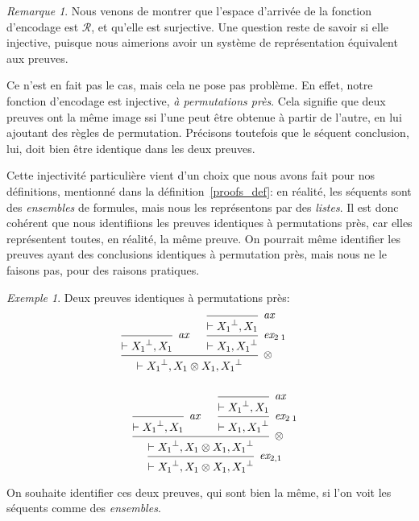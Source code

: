 \documentclass[11pt,a4paper]{article}
\theoremstyle{plain}
\theoremstyle{definition}
\theoremstyle{remark}
\newtheorem{remark}{Remarque}
\newtheorem{example}{Exemple}
\newcommand*{\orth}{^\perp}
\newcommand*{\tensor}{\otimes}
\newcommand*{\axv}[1]{\infer{0}[\ensuremath{\mathit{ax}}]{\vdash #1}}
\newcommand*{\tensorv}[1]{\infer{2}[\ensuremath{\tensor}]{\vdash #1}}
\newcommand*{\permv}[2]{\infer{1}[\ensuremath{\textit{ex}_{#1}}]{\vdash #2}}
\newcommand*{\representations}{\ensuremath{\mathcal{R}}}
\begin{document}
\begin{remark}
    \label{remark_kernel}
    Nous venons de montrer que l'espace d'arrivée de la fonction d'encodage est $\representations$, et qu'elle est surjective. Une question reste de savoir si elle injective, puisque nous aimerions avoir un système de représentation équivalent aux preuves.

    Ce n'est en fait pas le cas, mais cela ne pose pas problème. En effet, notre fonction d'encodage est injective, \textit{à permutations près}. Cela signifie que deux preuves ont la même image ssi l'une peut être obtenue à partir de l'autre, en lui ajoutant des règles de permutation. Précisons toutefois que le séquent conclusion, lui, doit bien être identique dans les deux preuves.

    Cette injectivité particulière vient d'un choix que nous avons fait pour nos définitions, mentionné dans la définition~\ref{proofs_def}: en réalité, les séquents sont des \textit{ensembles} de formules, mais nous les représentons par des \textit{listes}. Il est donc cohérent que nous identifiions les preuves identiques à permutations près, car elles représentent toutes, en réalité, la même preuve. On pourrait même identifier les preuves ayant des conclusions identiques à permutation près, mais nous ne le faisons pas, pour des raisons pratiques.

    \begin{example}Deux preuves identiques à permutations près:
        \begin{align*}
        \begin{multlined}
            \begin{prooftree}
               \axv{{X_1}\orth, X_1}
               \axv{{X_1}\orth, X_1}
               \permv{2 \;1}{X_1, {X_1}\orth}
            \tensorv{{X_1}\orth, X_1 \tensor X_1, {X_1}\orth}
            \end{prooftree} \\ \\
            \begin{prooftree}
               \axv{{X_1}\orth, X_1}
               \axv{{X_1}\orth, X_1}
               \permv{2 \;1}{X_1, {X_1}\orth}
            \tensorv{{X_1}\orth, X_1 \tensor X_1, {X_1}\orth}
            \permv{2, 1}{{X_1}\orth, X_1 \tensor X_1, {X_1}\orth}
            \end{prooftree}
        \end{multlined}
        \end{align*}

    On souhaite identifier ces deux preuves, qui sont bien la même, si l'on voit les séquents comme des \textit{ensembles}.
    \end{example}
\end{remark}
\end{document}
